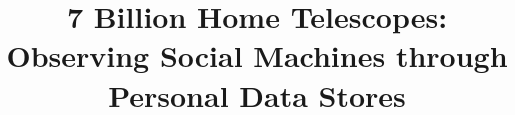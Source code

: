 \documentclass{acm_proc_article-sp}
\begin{document}
\title{7 Billion Home Telescopes: Observing Social Machines through Personal Data Stores}
%
%
%
%
%
\end{document}
